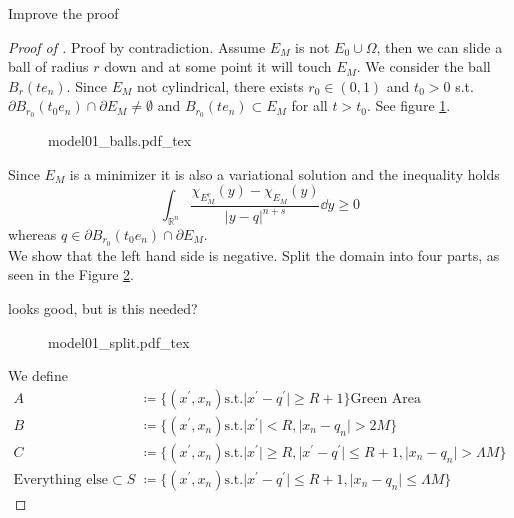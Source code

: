 \begin{TODO}
	Improve the proof
\end{TODO}
\begin{proof}[Proof of ]
	Proof by contradiction. Assume \( E_M \) is not \( E_0 \cup \Omega \), then we can
	slide a ball of radius \( r \) down and at some point it will touch \( E_M \). We
	consider the ball \( B_r (t e_n) \). Since \( E_M \) not cylindrical, there exists \(
	r_0 \in (0, 1) \) and \( t_0 > 0 \) s.t.\ \( \partial B_{r_0}(t_0 e_n) \cap \partial
	E_M \neq \emptyset \) and \( B_{r_0}(t e_n) \subset E_M \) for all \( t > t_0 \). See
	figure \cref{fig:102}.
	\begin{figure}[h]
		\centering
		\def\svgscale{1}
		{model01_balls.pdf_tex}
		\caption{}
		\label{fig:102}
	\end{figure}

	Since \( E_M \) is a minimizer it is also a variational solution and the inequality
	holds
	\[\int_{\mathbb{R}^n} \frac{\chi_{E_M^c}(y) - \chi_{E_M} (y)}{\lvert y - q\rvert^{n + s}} \dd{y} \geq 0
	\]
	whereas \( q \in \partial B_{r_0}(t_0 e_n) \cap \partial E_M \). \\
	We show that the left hand side is negative. Split the domain into four parts, as seen
	in the Figure \cref{fig:103}.

	\begin{CHECK}
		 looks good, but is this needed?
	\end{CHECK}

	\begin{figure}[h]
		\centering
		\def\svgscale{1}
		{model01_split.pdf_tex}
		\caption{}
		\label{fig:103}
	\end{figure}

	We define
	\begin{align*}
		A                                & \coloneqq \{(x^\prime, x_n) \text{s.t.} \lvert x^\prime - q^\prime \rvert \geq R + 1\} \text{Green Area} \\
		B                                & \coloneqq \{(x^\prime, x_n) \text{s.t.} \lvert x^\prime \rvert < R, \lvert x_n - q_n \rvert > 2M \} \\
		C                                & \coloneqq \{(x^\prime, x_n) \text{s.t.} \lvert x^\prime \rvert \geq R, \lvert x^\prime - q^\prime \rvert \leq R + 1, \lvert x_n - q_n \rvert > \Lambda M \} \\
		\text{Everything else} \subset S & \coloneqq \{(x^\prime, x_n) \text{s.t.} \lvert x^\prime - q^\prime \rvert \leq R + 1, \lvert x_n - q_n \rvert \leq \Lambda M \}
	\end{align*}



\end{proof}
